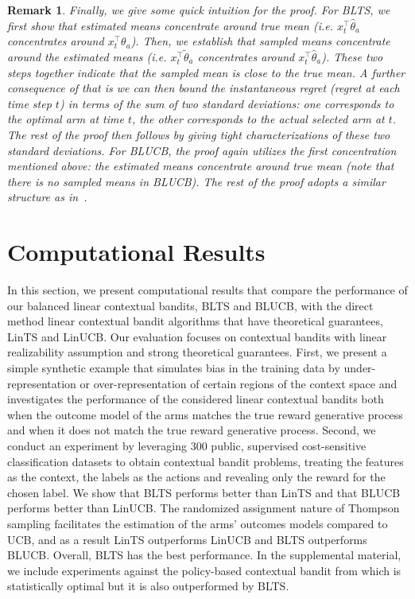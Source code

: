 \documentclass[letterpaper]{article} %
\newtheorem{remark}{Remark}
\begin{document}
\begin{remark}
Finally, we give some quick intuition for the proof. For  BLTS, we first show that estimated means concentrate around true mean (i.e. $x_t^\top \hat{\theta}_a$ concentrates around $x_t^\top \theta_a$). Then, we establish that sampled means concentrate around the estimated means (i.e. $x_t^\top\tilde{\theta}_a$  concentrates around $x_t^\top\hat{\theta}_a$). These two steps together indicate that the sampled mean is close to the true mean. A further consequence of that is we can then bound the instantaneous regret (regret at each time step $t$) in terms of the sum of two standard deviations: one corresponds to the optimal arm at time $t$, the other corresponds to the actual selected arm at $t$. The rest of the proof then follows by giving tight characterizations of these two standard deviations. For BLUCB, the proof again utilizes the first concentration mentioned above: the estimated means concentrate around true mean (note that there is no sampled means in BLUCB). The rest of the proof adopts a similar structure as in~\cite{chu2011contextual}.
\end{remark}

\section{Computational Results}

In this section, we present computational results that compare the performance of our balanced linear contextual bandits, BLTS and BLUCB, with the direct method linear contextual bandit algorithms that have theoretical guarantees, LinTS and LinUCB.
Our evaluation focuses on contextual bandits with linear realizability assumption and strong theoretical guarantees.
First, we present a simple synthetic example that simulates bias in the training data by under-representation or over-representation of certain regions of the context space and investigates the performance of the considered linear contextual bandits both when the outcome model of the arms matches the true reward generative process and when it does not match the true reward generative process.
Second, we conduct an experiment by leveraging 300 public, supervised cost-sensitive classification datasets to obtain contextual bandit problems, treating the features as the context, the labels as the actions and revealing only the reward for the chosen label.
We show that BLTS performs better than LinTS and that BLUCB performs better than LinUCB.
The randomized assignment nature of Thompson sampling facilitates the estimation of the arms' outcomes models compared to UCB, and as a result LinTS outperforms LinUCB and BLTS outperforms BLUCB.
Overall, BLTS has the best performance.
In the supplemental material, we include experiments against the policy-based contextual bandit from \cite{agarwal-ilovetoconbandits} which is statistically optimal but it is also outperformed by BLTS.
\end{document}

